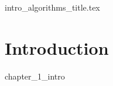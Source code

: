 \documentclass[A4,12pt,twoside]{book}
\begin{document}
	\frontmatter
	{intro_algorithms_title.tex}
	\clearpage
	\thispagestyle{empty}
	
	\tableofcontents
	
	\mainmatter
	
	

\chapter{Introduction}
{chapter_1_intro}
\end{document}
